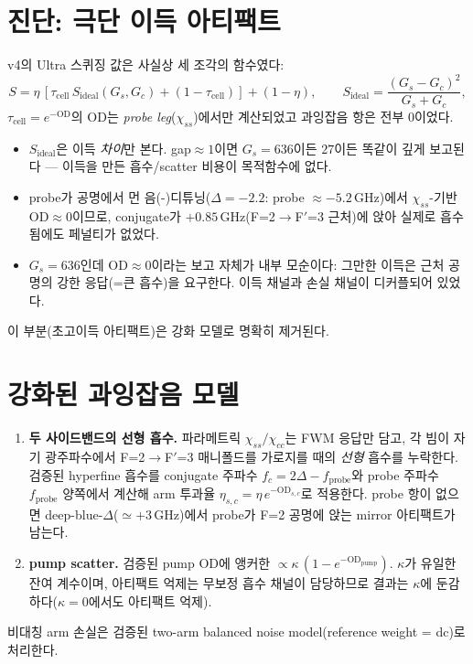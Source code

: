 \documentclass[11pt,a4paper]{article}
\newcommand{\GHz}{\,\mathrm{GHz}}
\begin{document}
\section{진단: 극단 이득 아티팩트}
v4의 Ultra 스퀴징 값은 사실상 세 조각의 함수였다:
\begin{equation}
S = \eta\,[\tau_{\mathrm{cell}}\,S_{\mathrm{ideal}}(G_s,G_c) + (1-\tau_{\mathrm{cell}})]
    + (1-\eta),\qquad
S_{\mathrm{ideal}}=\frac{(G_s-G_c)^2}{G_s+G_c},
\end{equation}
$\tau_{\mathrm{cell}}=e^{-\mathrm{OD}}$의 OD는 \emph{probe leg}($\chi_{ss}$)에서만
계산되었고 과잉잡음 항은 전부 $0$이었다.
\begin{itemize}[nosep]
\item $S_{\mathrm{ideal}}$은 이득 \emph{차이}만 본다. gap$\approx1$이면 $G_s=636$이든
      $27$이든 똑같이 깊게 보고된다 --- 이득을 만든 흡수/scatter 비용이 목적함수에
      없다.
\item probe가 공명에서 먼 음(-)디튜닝($\Delta=-2.2$: probe $\approx-5.2\GHz$)에서
      $\chi_{ss}$-기반 OD$\approx0$이므로, conjugate가 $+0.85\GHz$(F=2$\to$F$'$=3
      근처)에 앉아 실제로 흡수됨에도 페널티가 없었다.
\item $G_s=636$인데 OD$\approx0$이라는 보고 자체가 내부 모순이다: 그만한 이득은
      근처 공명의 강한 응답(=큰 흡수)을 요구한다. 이득 채널과 손실 채널이
      디커플되어 있었다.
\end{itemize}
이 부분(초고이득 아티팩트)은 강화 모델로 명확히 제거된다.

\section{강화된 과잉잡음 모델}
\begin{enumerate}[nosep]
\item \textbf{두 사이드밴드의 선형 흡수.} 파라메트릭 $\chi_{ss}/\chi_{cc}$는 FWM
      응답만 담고, 각 빔이 자기 광주파수에서 F=2$\to$F$'$=3 매니폴드를 가로지를 때의
      \emph{선형} 흡수를 누락한다. 검증된 hyperfine 흡수를 conjugate 주파수
      $f_c=2\Delta-f_{\mathrm{probe}}$와 probe 주파수 $f_{\mathrm{probe}}$ 양쪽에서
      계산해 arm 투과율 $\eta_{s,c}=\eta\,e^{-\mathrm{OD}_{s,c}}$로 적용한다. probe
      항이 없으면 deep-blue-$\Delta$($\simeq+3\GHz$)에서 probe가 F=2 공명에 앉는
      mirror 아티팩트가 남는다.
\item \textbf{pump scatter.} 검증된 pump OD에 앵커한
      $\propto\kappa\,(1-e^{-\mathrm{OD}_{\mathrm{pump}}})$. $\kappa$가 유일한 잔여
      계수이며, 아티팩트 억제는 무보정 흡수 채널이 담당하므로 결과는 $\kappa$에
      둔감하다($\kappa=0$에서도 아티팩트 억제).
\end{enumerate}
비대칭 arm 손실은 검증된 two-arm balanced noise model(reference weight = dc)로 처리한다.
\end{document}
